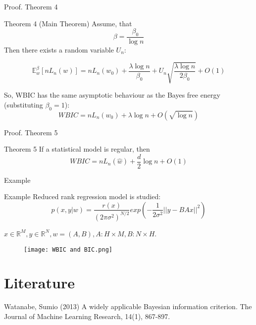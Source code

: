 \documentclass{beamer}
\begin{document}
\begin{frame}{Proof. Theorem 4}
\begin{block}{Theorem 4 (Main Theorem)}
    Assume, that
    $$
        \beta = \frac{\beta_0}{\log n}
    $$
    Then there exists a random variable $U_n$:

    $$
        \mathbb{E}_w^{\beta}\left[nL_n(w) \right] = nL_n(w_0) + \frac{\lambda \log n}{\beta_0} + U_n\sqrt{\frac{\lambda \log n}{2\beta_0}} + O(1)
    $$

    
    So, WBIC has the same asymptotic behaviour as the Bayes free energy (substituting $\beta_0=1$):
    $$
        WBIC = nL_n(w_0) + \lambda \log n + O(\sqrt{\log n})
    $$
\end{block}

\end{frame}


\begin{frame}{Proof. Theorem 5}
\begin{block}{Theorem 5}
    If a statistical model is regular, then
    $$
        WBIC = nL_n(\hat{w}) + \frac{d}{2}\log n + O(1)
    $$
\end{block}
\end{frame}


\begin{frame}{Example}
\begin{block}{Example}
    Reduced rank regression model is studied:
    $$
        p(x, y|w) = \frac{r(x)}{(2\pi\sigma^2)^{N/2}}exp\left(-\frac{1}{2\sigma^2}||y-BAx||^2\right)
    $$

    $x \in \mathbb{R}^M, y \in \mathbb{R}^N, w = (A, B), A: H \times M, B: N \times H$.
\end{block}

\begin{figure}
    \centering
    \texttt{[image: WBIC and BIC.png]}
    \caption{}
    \label{fig:enter-label}
\end{figure}

\end{frame}






















\section{Literature}
\begin{frame}
\begin{thebibliography}{99} 
    \footnotesize
    
        Watanabe, Sumio (2013)
        \newblock A widely applicable Bayesian information criterion. The Journal of Machine Learning Research, 14(1), 867-897.
\end{thebibliography}
\end{frame}
\end{document}
